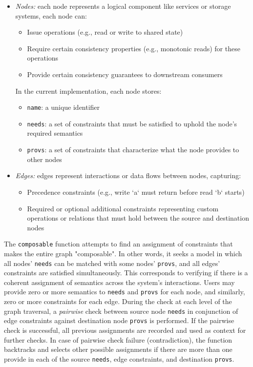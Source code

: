 \begin{itemize}
  \item \textit{Nodes:} each node represents a logical component like
    services or storage
    systems, each node can:
    \begin{itemize}
      \item Issue operations (e.g., read or write to shared state)
      \item Require certain consistency properties (e.g., monotonic
        reads) for these
        operations
      \item Provide certain consistency guarantees to downstream consumers
    \end{itemize}
    In the current implementation, each node stores:
    \begin{itemize}
      \item \texttt{name}: a unique identifier
      \item \texttt{needs}: a set of constraints that must be
        satisfied to uphold the node's
        required semantics
      \item \texttt{provs}: a set of constraints that characterize
        what the node provides to other
        nodes
    \end{itemize}

  \item \textit{Edges:} edges represent interactions or data flows
    between nodes, capturing:
    \begin{itemize}
      \item Precedence constraints (e.g., write `a` must return
        before read `b` starts) %
      \item Required or optional additional constraints representing
        custom operations or
        relations that must hold between the source and destination nodes
    \end{itemize}
\end{itemize}

The \texttt{composable} function attempts to find an assignment of
constraints that
makes the entire graph "composable". In other words, it seeks a model in which
all nodes' \texttt{needs} can be matched with some nodes'
\texttt{provs}, and all edges'
constraints are satisfied simultaneously. This corresponds to verifying if there
is a coherent assignment of semantics across the system's interactions. Users
may provide zero or more semantics to \texttt{needs} and
\texttt{provs} for each node, and
similarly, zero or more constraints for each edge. During the check at each
level of the graph traversal, a \textit{pairwise} check between
source node \texttt{needs} in
conjunction of edge constraints against destination node
\texttt{provs} is performed.
If the pairwise check is successful, all previous assignments are recorded and
used as context for further checks. In case of pairwise check failure
(contradiction), the function backtracks and selects other possible assignments
if there are more than one provide in each of the source
\texttt{needs}, edge constraints, and destination \texttt{provs}.

